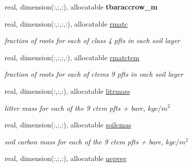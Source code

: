 \begin{DoxyCompactItemize}
\item 
\hypertarget{structctem__statevars_1_1veg__rot_a8c0eba35f4e2169d127555df765d66c1}{}real, dimension(\+:,\+:,\+:), allocatable {\bfseries tbaraccrow\+\_\+m}\label{structctem__statevars_1_1veg__rot_a8c0eba35f4e2169d127555df765d66c1}

\item 
\hypertarget{structctem__statevars_1_1veg__rot_adb57737e62696ccdb660642e3471f7e5}{}real, dimension(\+:,\+:,\+:,\+:), allocatable \hyperlink{structctem__statevars_1_1veg__rot_adb57737e62696ccdb660642e3471f7e5}{rmatc}\label{structctem__statevars_1_1veg__rot_adb57737e62696ccdb660642e3471f7e5}

\begin{DoxyCompactList}\small\item\em fraction of roots for each of class\textquotesingle{} 4 pfts in each soil layer \end{DoxyCompactList}\item 
\hypertarget{structctem__statevars_1_1veg__rot_add3e9e9ceb7c8cbd22ca5c43d50eb8c7}{}real, dimension(\+:,\+:,\+:,\+:), allocatable \hyperlink{structctem__statevars_1_1veg__rot_add3e9e9ceb7c8cbd22ca5c43d50eb8c7}{rmatctem}\label{structctem__statevars_1_1veg__rot_add3e9e9ceb7c8cbd22ca5c43d50eb8c7}

\begin{DoxyCompactList}\small\item\em fraction of roots for each of ctem\textquotesingle{}s 9 pfts in each soil layer \end{DoxyCompactList}\item 
\hypertarget{structctem__statevars_1_1veg__rot_a14b56165e69b106d277c23c63e322a07}{}real, dimension(\+:,\+:,\+:), allocatable \hyperlink{structctem__statevars_1_1veg__rot_a14b56165e69b106d277c23c63e322a07}{litrmass}\label{structctem__statevars_1_1veg__rot_a14b56165e69b106d277c23c63e322a07}

\begin{DoxyCompactList}\small\item\em litter mass for each of the 9 ctem pfts + bare, $kg c/m^2$ \end{DoxyCompactList}\item 
\hypertarget{structctem__statevars_1_1veg__rot_a0e94ebd2be54df84253bfa5ddf0fc5d1}{}real, dimension(\+:,\+:,\+:), allocatable \hyperlink{structctem__statevars_1_1veg__rot_a0e94ebd2be54df84253bfa5ddf0fc5d1}{soilcmas}\label{structctem__statevars_1_1veg__rot_a0e94ebd2be54df84253bfa5ddf0fc5d1}

\begin{DoxyCompactList}\small\item\em soil carbon mass for each of the 9 ctem pfts + bare, $kg c/m^2$ \end{DoxyCompactList}\item 
\hypertarget{structctem__statevars_1_1veg__rot_a4d7796e1822fe39d383fb6199fa1b611}{}real, dimension(\+:,\+:,\+:), allocatable \hyperlink{structctem__statevars_1_1veg__rot_a4d7796e1822fe39d383fb6199fa1b611}{nepveg}\label{structctem__statevars_1_1veg__rot_a4d7796e1822fe39d383fb6199fa1b611}


\end{DoxyCompactItemize}
